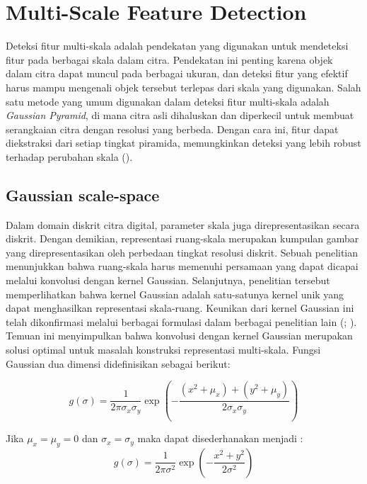 \section{Multi-Scale Feature Detection}
  Deteksi fitur multi-skala adalah pendekatan yang digunakan untuk mendeteksi fitur pada berbagai skala dalam citra. Pendekatan ini penting karena objek dalam citra dapat muncul pada berbagai ukuran, dan deteksi fitur yang efektif harus mampu mengenali objek tersebut terlepas dari skala yang digunakan. Salah satu metode yang umum digunakan dalam deteksi fitur multi-skala adalah \emph{Gaussian Pyramid}, di mana citra asli dihaluskan dan diperkecil untuk membuat serangkaian citra dengan resolusi yang berbeda. Dengan cara ini, fitur dapat diekstraksi dari setiap tingkat piramida, memungkinkan deteksi yang lebih robust terhadap perubahan skala (\cite[hlm. 91--92]{Lowe2004}).

\subsection{Gaussian scale-space}

Dalam domain diskrit citra digital, parameter skala juga direpresentasikan secara diskrit. 
Dengan demikian, representasi ruang-skala merupakan kumpulan gambar yang direpresentasikan oleh perbedaan tingkat resolusi diskrit. 
Sebuah penelitian menunjukkan bahwa ruang-skala harus memenuhi persamaan yang dapat dicapai melalui konvolusi dengan kernel Gaussian. 
Selanjutnya, penelitian tersebut memperlihatkan bahwa kernel Gaussian adalah satu-satunya kernel unik yang dapat menghasilkan representasi skala-ruang. 
Keunikan dari kernel Gaussian ini telah dikonfirmasi melalui berbagai formulasi dalam berbagai penelitian lain (\cite[hlm. 92--93]{Lowe2004}; \cite[hlm. 13--15]{mikolajczyk:tel-00584096}). 
Temuan ini menyimpulkan bahwa konvolusi dengan kernel Gaussian merupakan solusi optimal untuk masalah konstruksi representasi multi-skala. Fungsi Gaussian dua dimensi didefinisikan sebagai berikut:

\begin{equation*}
g(\sigma) = \frac{1}{2\pi\sigma_{x}\sigma_{y}}\exp\left(-\frac{(x^2+\mu_{x})+(y^2+\mu_{y})}{2\sigma_{x}\sigma_{y}}\right)
\end{equation*}

Jika \(\mu_{x} = \mu_{y} = 0\) dan \(\sigma_{x} = \sigma_{y}\) maka dapat disederhanakan menjadi :
\begin{equation}
g(\sigma) = \frac{1}{2\pi\sigma^2}\exp\left(-\frac{x^2+y^2}{2\sigma^2}\right)
\label{eq:gaussian kernel}
\end{equation}

